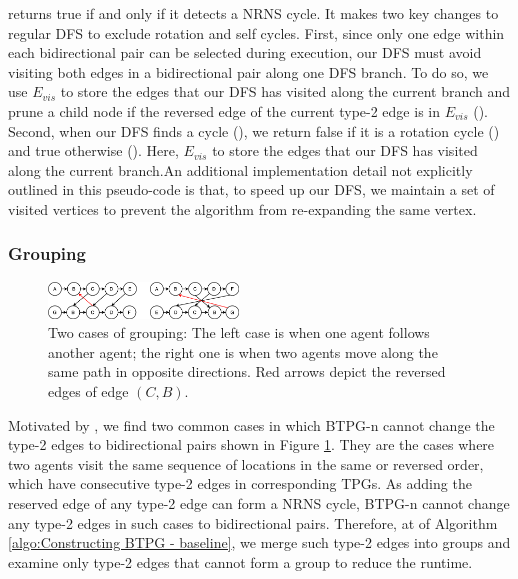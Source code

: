 \documentclass[letterpaper]{article} %
\theoremstyle{definition}
\begin{document}
 returns true if and only if it detects a NRNS cycle. It makes two key changes to regular DFS to exclude rotation and self cycles.
First, since only one edge within each bidirectional pair can be selected during execution, our DFS must avoid visiting both edges in a bidirectional pair along one DFS branch. To do so, we use $E_{vis}$ to store the edges that our DFS has visited along the current branch and prune a child node if the reversed edge of the current type-2 edge is in $E_{vis}$ ().
Second, when our DFS finds a cycle (), we return false if it is a rotation cycle () and true otherwise (). Here, $E_{vis}$ to store the edges that our DFS has visited along the current branch.An additional implementation detail not explicitly outlined in this pseudo-code is that, to speed up our DFS, we maintain a set of visited vertices to prevent the algorithm from re-expanding the same vertex.


\subsubsection{Grouping}
\begin{figure}[t]
         \centering
         \includegraphics[width=0.45\textwidth]{Figs/groups.png}

        \caption{Two cases of grouping: The left case is when one agent follows another agent; the right one is when two agents move along the same path in opposite directions. Red arrows depict the reversed edges of edge $(C,B)$.}
        \label{fig:three TPGs}
\end{figure}

Motivated by \cite{berndt_feedback_2020}, we find two common cases in which BTPG-n cannot change the type-2 edges to bidirectional pairs shown in Figure \ref{fig:three TPGs}. They are the cases where two agents visit the same sequence of locations in the same or reversed order, which have consecutive type-2 edges in corresponding TPGs. As adding the reserved edge of any type-2 edge can form a NRNS cycle, BTPG-n cannot change any type-2 edges in such cases to bidirectional pairs.
Therefore, at  of Algorithm \ref{algo:Constructing BTPG - baseline}, we merge such type-2 edges into groups and examine only type-2 edges that cannot form a group to reduce the runtime.
\end{document}
